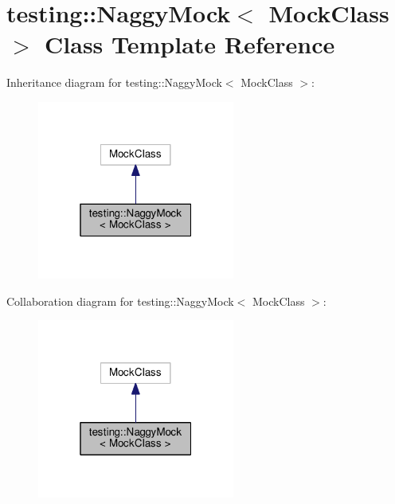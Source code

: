\hypertarget{classtesting_1_1NaggyMock}{}\section{testing\+:\+:Naggy\+Mock$<$ Mock\+Class $>$ Class Template Reference}
\label{classtesting_1_1NaggyMock}


Inheritance diagram for testing\+:\+:Naggy\+Mock$<$ Mock\+Class $>$\+:\nopagebreak
\begin{figure}[H]
\begin{center}
\leavevmode
\includegraphics[width=184pt]{classtesting_1_1NaggyMock__inherit__graph}
\end{center}
\end{figure}


Collaboration diagram for testing\+:\+:Naggy\+Mock$<$ Mock\+Class $>$\+:\nopagebreak
\begin{figure}[H]
\begin{center}
\leavevmode
\includegraphics[width=184pt]{classtesting_1_1NaggyMock__coll__graph}
\end{center}
\end{figure}
